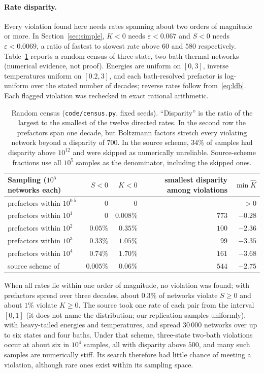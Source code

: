 \documentclass[11pt,a4paper]{article}
\theoremstyle{remark}\newtheorem{remark}[theorem]{Remark}
\newcommand{\eps}{\varepsilon}
\begin{document}
\paragraph{Rate disparity.} Every violation found here needs rates spanning about two orders of magnitude or more. In Section~\ref{sec:simple}, $K<0$ needs $\eps<0.067$ and $S<0$ needs $\eps<0.0069$, a ratio of fastest to slowest rate above $60$ and $580$ respectively. Table~\ref{tab:census} reports a random census of three-state, two-bath thermal networks (numerical evidence, not proof). Energies are uniform on $[0,3]$, inverse temperatures uniform on $[0.2,3]$, and each bath-resolved prefactor is log-uniform over the stated number of decades; reverse rates follow from~\eqref{eq:ldb}. Each flagged violation was rechecked in exact rational arithmetic.

\begin{table}[tb]\centering\small
\begin{tabular}{lrrrr}
\toprule
Sampling ($10^5$ networks each) & $S<0$ & $K<0$ & smallest disparity among violations & $\min\hat K$\\
\midrule
prefactors within $10^{0.5}$ & $0$ & $0$ & -- & $>0$\\
prefactors within $10^{1}$ & $0$ & $0.008\%$ & $773$ & $-0.28$\\
prefactors within $10^{2}$ & $0.05\%$ & $0.35\%$ & $100$ & $-2.36$\\
prefactors within $10^{3}$ & $0.33\%$ & $1.05\%$ & $99$ & $-3.35$\\
prefactors within $10^{4}$ & $0.74\%$ & $1.70\%$ & $161$ & $-3.68$\\
source scheme of~\cite{Ptaszynski2022} & $0.005\%$ & $0.06\%$ & $544$ & $-2.75$\\
\bottomrule
\end{tabular}
\caption{Random census (\texttt{code/census.py}, fixed seeds). ``Disparity'' is the ratio of the largest to the smallest of the twelve directed rates. In the second row the prefactors span one decade, but Boltzmann factors stretch every violating network beyond a disparity of $700$. In the source scheme, $34\%$ of samples had disparity above $10^{12}$ and were skipped as numerically unreliable. Source-scheme fractions use all $10^5$ samples as the denominator, including the skipped ones.}\label{tab:census}
\end{table}

When all rates lie within one order of magnitude, no violation was found; with prefactors spread over three decades, about $0.3\%$ of networks violate $S\ge0$ and about $1\%$ violate $K\ge0$. The source took one rate of each pair from the interval $[0,1]$ (it does not name the distribution; our replication samples uniformly), with heavy-tailed energies and temperatures, and spread $30\,000$ networks over up to six states and four baths. Under that scheme, three-state two-bath violations occur at about six in $10^4$ samples, all with disparity above $500$, and many such samples are numerically stiff. Its search therefore had little chance of meeting a violation, although rare ones exist within its sampling space.
\end{document}
